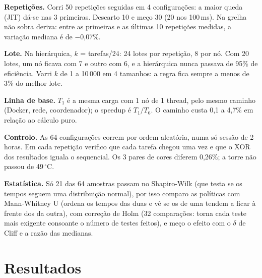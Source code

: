 \documentclass[sigplan]{acmart}
\begin{document}
\smallskip
\noindent\textbf{Repetições.} Corri 50 repetições seguidas em 4 configurações: a maior queda
(JIT) dá-se nas 3 primeiras. Descarto 10 e meço 30 (20 nos 100\,ms). Na grelha não sobra
deriva: entre as primeiras e as últimas 10 repetições medidas, a variação mediana é de $-$0,07\%.

\smallskip
\noindent\textbf{Lote.} Na hierárquica, $k$ = tarefas/24: 24 lotes por repetição, 8 por nó.
Com 20 lotes, um nó ficava com 7 e outro com 6, e a hierárquica nunca passava de 95\% de
eficiência. Varri $k$ de 1 a 10\,000 em 4 tamanhos: a regra fica sempre a menos de 3\% do
melhor lote.

\smallskip
\noindent\textbf{Linha de base.} $T_1$ é a mesma carga com 1 nó de 1 thread, pelo mesmo
caminho (Docker, rede, coordenador); o speedup é $T_1/T_6$. O caminho custa 0,1 a 4,7\% em
relação ao cálculo puro.

\smallskip
\noindent\textbf{Controlo.} As 64 configurações correm por ordem aleatória, numa só sessão de
2 horas. Em cada repetição verifico que cada tarefa chegou uma vez e que o XOR dos resultados
iguala o sequencial. Os 3 pares de cores diferem 0,26\%; a torre não passou de 49\,$^\circ$C.

\smallskip
\noindent\textbf{Estatística.} Só 21 das 64 amostras passam no Shapiro-Wilk (que testa se
os tempos seguem uma distribuição normal), por isso comparo as políticas com Mann-Whitney U
(ordena os tempos das duas e vê se os de uma tendem a ficar à frente dos da outra), com
correção de Holm (32 comparações: torna cada teste mais exigente consoante o número de testes
feitos), e meço o efeito com o $\delta$ de Cliff e a razão das medianas.
\newpage
\section{Resultados}
\end{document}
